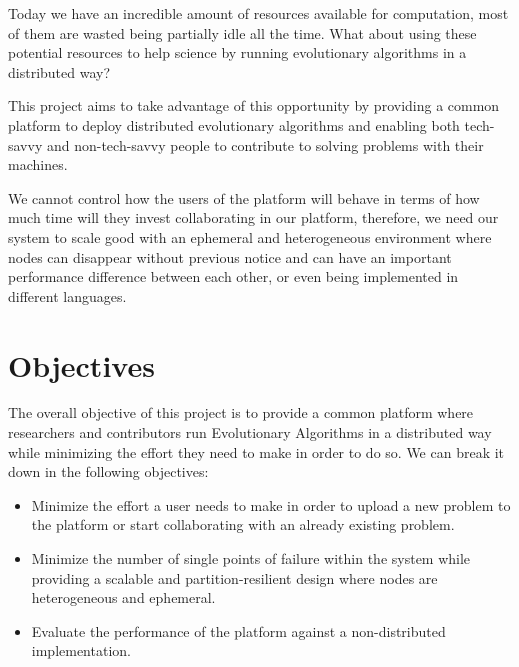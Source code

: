 Today we have an incredible amount of resources available for computation, most of them are wasted being partially idle all the time. What about using these potential resources to help science by running evolutionary algorithms in a distributed way?

This project aims to take advantage of this opportunity by providing a common platform to deploy distributed evolutionary algorithms and enabling both tech-savvy and non-tech-savvy people to contribute to solving problems with their machines.

We cannot control how the users of the platform will behave in terms of how much time will they invest collaborating in our platform, therefore, we need our system to scale good with an ephemeral and heterogeneous environment where nodes can disappear without previous notice and can have an important performance difference between each other, or even being implemented in different languages. 


\section{Objectives}
The overall objective of this project is to provide a common platform where researchers and contributors run Evolutionary Algorithms in a distributed way while minimizing the effort they need to make in order to do so. We can break it down in the following objectives:

\begin{itemize}
    \item Minimize the effort a user needs to make in order to upload a new problem to the platform or start collaborating with an already existing problem. 
    
    \item Minimize the number of single points of failure within the system while providing a scalable and partition-resilient design where nodes are heterogeneous and ephemeral.
    
    \item Evaluate the performance of the platform against a non-distributed implementation.
\end{itemize}
